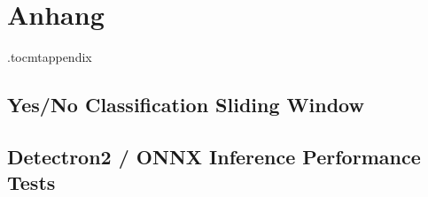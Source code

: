 \newpage

\chapter*{Anhang}
\etocdepthtag.toc{mtappendix}
\addtableofcontents

\section*{Yes/No Classification Sliding Window} \label{sec:r-cnn-paper}




\section*{Detectron2 / ONNX Inference Performance Tests} \label{sec:cnn-perf-test}









%
%
%
%
%
%